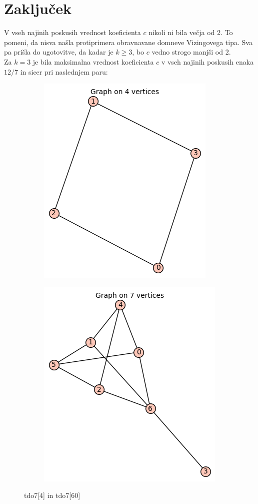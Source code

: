\documentclass[12pt, a4paper]{article}
\begin{document}
\section{Zaključek}
V vseh najinih poskusih vrednost koeficienta $c$ nikoli ni bila večja od 2. To pomeni, da nisva našla protiprimera obravnavane domneve Vizingovega tipa. Sva pa prišla do ugotovitve, da kadar je $k \geq 3$, bo $c$ vedno strogo manjši od 2.\\ 
Za $k=3$  je bila maksimalna vrednost koeficienta $c$ v vseh najinih poskusih enaka $12/7$ in sicer pri naslednjem paru: 
\begin{center}
\begin{figure}[!htb]
\centering
\begin{subfigure}{0.5\textwidth}
  \centering
  \includegraphics[width=0.4\linewidth]{tdo7[4]}
\end{subfigure}%
\begin{subfigure}{0.5\textwidth}
  \centering
  \includegraphics[width=0.5\linewidth]{tdo7[60]}
\end{subfigure}
\caption{tdo7[4] in tdo7[60]}
\label{fig:test}
\end{figure}
\end{center}
\clearpage
\end{document}
